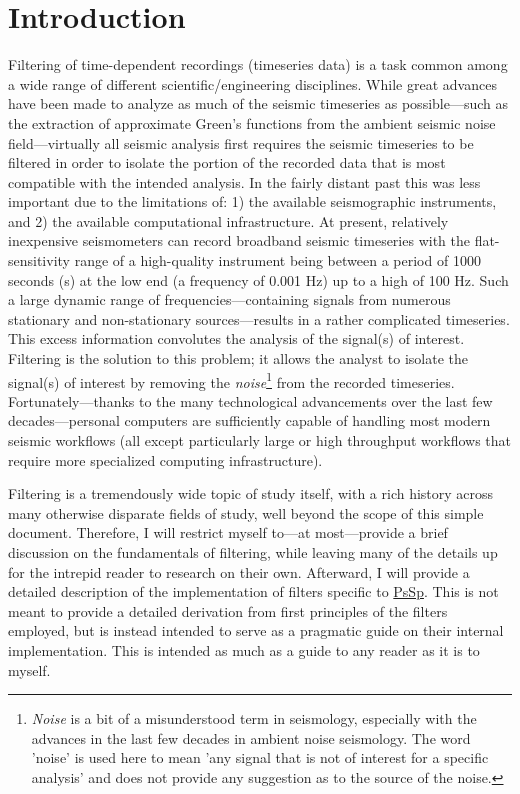 \documentclass[american, twoside]{article}
\begin{document}
\section{Introduction} \label{Introduction}
Filtering of time-dependent recordings (timeseries data) is a task common among a wide range of different scientific/engineering disciplines.
While great advances have been made to analyze as much of the seismic timeseries as possible---such as the extraction of approximate
Green's functions from the ambient seismic noise field---virtually all seismic analysis first requires the seismic timeseries to
be filtered in order to isolate the portion of the recorded data that is most compatible with the intended analysis. In the fairly
distant past this was less important due to the limitations of: 1) the available seismographic instruments, and 2) the available
computational infrastructure. At present, relatively inexpensive seismometers can record broadband seismic timeseries with the flat-sensitivity
range of a high-quality instrument being between a period of 1000 seconds (s) at the low end (a frequency of 0.001 Hz) up to a high
of 100 Hz. Such a large dynamic range of frequencies---containing signals from numerous stationary and non-stationary sources---results in a
rather complicated timeseries. This excess information convolutes the analysis of the signal(s) of interest.
Filtering is the solution to this problem; it allows the analyst to isolate the signal(s) of interest by removing the \textit{noise}\footnote{\textit{Noise} is a bit of a misunderstood term in
seismology, especially with the advances in the last few decades in ambient noise seismology. The word 'noise' is used here to mean 'any
signal that is not of interest for a specific analysis' and does not provide any suggestion as to the source of the noise.} from the
recorded timeseries. Fortunately---thanks to the many technological advancements over the last few decades---personal computers are sufficiently
capable of handling most modern seismic workflows (all except particularly large or high throughput workflows that require more specialized
computing infrastructure).

Filtering is a tremendously wide topic of study itself, with a rich history across many otherwise disparate fields of study, well
beyond the scope of this simple document. Therefore, I will restrict myself to---at most---provide a brief discussion
on the fundamentals of filtering, while leaving many of the details up for the intrepid reader to research on their own. Afterward,
I will provide a detailed description of the implementation of filters specific to \href{https://github.com/arbCoding/PsSp}{PsSp}.
This is not meant to provide a detailed derivation from first principles of the filters employed, but is instead intended to serve as
a pragmatic guide on their internal implementation. This is intended as much as a guide to any reader as it is to myself.
\end{document}
